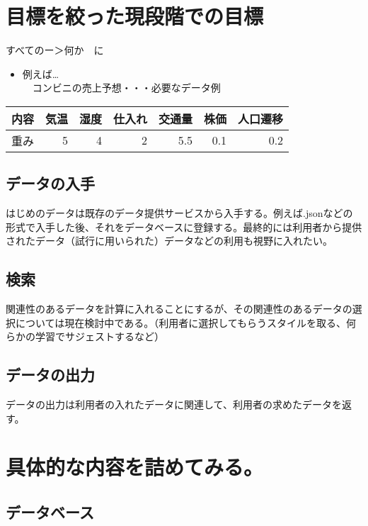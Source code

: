 \documentclass{scrartcl}
\begin{document}
\section{目標を絞った現段階での目標}
\label{sec:org063b1eb}
すべてのー＞何か　に\\
\begin{itemize}
\item 例えば\ldots{}\\
　コンビニの売上予想・・・必要なデータ例\\
\end{itemize}
\begin{center}
\begin{tabular}{lrrrrrr}
\hline
内容 & 気温 & 湿度 & 仕入れ & 交通量 & 株価 & 人口遷移\\
\hline
重み & 5 & 4 & 2 & 5.5 & 0.1 & 0.2\\
\hline
\end{tabular}
\end{center}
\subsection{データの入手}
\label{sec:orgcd473eb}
はじめのデータは既存のデータ提供サービスから入手する。例えば.jsonなどの形式で入手した後、それをデータベースに登録する。最終的には利用者から提供されたデータ（試行に用いられた）データなどの利用も視野に入れたい。\\
\subsection{検索}
\label{sec:org6a41ea1}
関連性のあるデータを計算に入れることにするが、その関連性のあるデータの選択については現在検討中である。（利用者に選択してもらうスタイルを取る、何らかの学習でサジェストするなど）\\
\subsection{データの出力}
\label{sec:org3358a70}
データの出力は利用者の入れたデータに関連して、利用者の求めたデータを返す。\\
\section{具体的な内容を詰めてみる。}
\label{sec:org33d10c1}
\subsection{データベース}
\label{sec:org7b55c1d}
\end{document}

